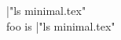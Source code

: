 \documentclass{minimal}
\makeatletter
\newcommand{\foo}{\@@input|"ls minimal.tex"}
\newcommand\boo{foo is \foo}
\makeatother
\begin{document}
\foo\\
\boo
\end{document}
